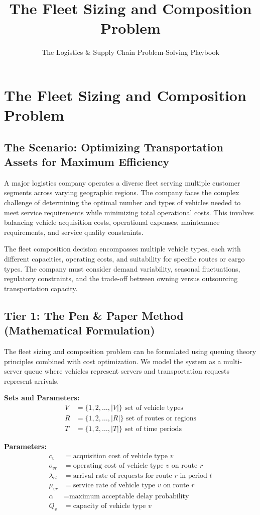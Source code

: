 \documentclass{article}
\title{The Fleet Sizing and Composition Problem}
\author{The Logistics \& Supply Chain Problem-Solving Playbook}
\date{}
\begin{document}
\maketitle

\section{The Fleet Sizing and Composition Problem}

\subsection{The Scenario: Optimizing Transportation Assets for Maximum Efficiency}

A major logistics company operates a diverse fleet serving multiple customer segments across varying geographic regions. The company faces the complex challenge of determining the optimal number and types of vehicles needed to meet service requirements while minimizing total operational costs. This involves balancing vehicle acquisition costs, operational expenses, maintenance requirements, and service quality constraints.

The fleet composition decision encompasses multiple vehicle types, each with different capacities, operating costs, and suitability for specific routes or cargo types. The company must consider demand variability, seasonal fluctuations, regulatory constraints, and the trade-off between owning versus outsourcing transportation capacity.

\subsection{Tier 1: The Pen \& Paper Method (Mathematical Formulation)}

The fleet sizing and composition problem can be formulated using queuing theory principles combined with cost optimization. We model the system as a multi-server queue where vehicles represent servers and transportation requests represent arrivals.

\textbf{Sets and Parameters:}
\begin{align}
V &= \{1, 2, \ldots, |V|\} \text{ set of vehicle types} \\
R &= \{1, 2, \ldots, |R|\} \text{ set of routes or regions} \\
T &= \{1, 2, \ldots, |T|\} \text{ set of time periods}
\end{align}

\textbf{Parameters:}
\begin{align}
c_v &= \text{acquisition cost of vehicle type } v \\
o_{vr} &= \text{operating cost of vehicle type } v \text{ on route } r \\
\lambda_{rt} &= \text{arrival rate of requests for route } r \text{ in period } t \\
\mu_{vr} &= \text{service rate of vehicle type } v \text{ on route } r \\
\alpha &= \text{maximum acceptable delay probability} \\
Q_v &= \text{capacity of vehicle type } v
\end{align}
\end{document}
